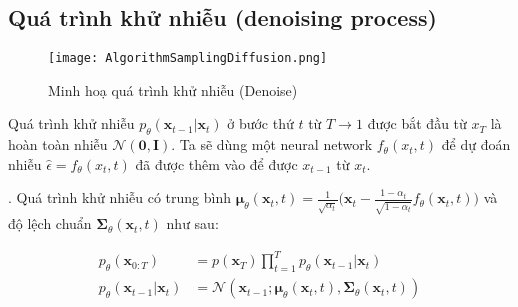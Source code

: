 \subsection{Quá trình khử nhiễu (denoising process)}
\label{subsection:denoising_process}

\begin{figure}[]
	\centering
	\texttt{[image: AlgorithmSamplingDiffusion.png]}
	\caption{Minh hoạ quá trình khử nhiễu (Denoise)}
	\label{fig:AlgorithmSamplingDiffusion}
	\vspace{-20pt}
\end{figure}

Quá trình khử nhiễu $p_\theta(\mathbf{x}_{t-1} \vert \mathbf{x}_t)$  ở bước thứ $t$ từ $T \to 1$ được bắt đầu từ $x_T$ là hoàn toàn nhiễu $\mathcal{N} (\mathbf{0}, \mathbf{I})$. Ta sẽ dùng một neural network $f_{\theta} (x_t, t)$ để dự đoán nhiễu $\hat{\epsilon} = f_{\theta}(x_t, t)$ đã được thêm vào để được $x_{t-1}$ từ $x_t$.

. Quá trình khử nhiễu có trung bình $\boldsymbol{\mu}_\theta(\mathbf{x}_t, t) = {\frac{1}{\sqrt{\alpha_t}} \Big( \mathbf{x}_t - \frac{1 - \alpha_t}{\sqrt{1 - \bar{\alpha}_t}}  f_\theta(\mathbf{x}_t, t) \Big)}$ và độ lệch chuẩn $\boldsymbol{\Sigma}_\theta(\mathbf{x}_t, t)$ như sau:




\begin{equation}
	\label{eq:denoising_process}
	\begin{aligned}
		p_\theta(\mathbf{x}_{0:T})
		&= p(\mathbf{x}_T) \prod^T_{t=1} p_\theta(\mathbf{x}_{t-1} \vert \mathbf{x}_t) \\
		p_\theta(\mathbf{x}_{t-1} \vert \mathbf{x}_t) &= \mathcal{N}(\mathbf{x}_{t-1};  \boldsymbol{\mu}_\theta(\mathbf{x}_t, t), \boldsymbol{\Sigma}_\theta(\mathbf{x}_t, t))
	\end{aligned}
\end{equation}



